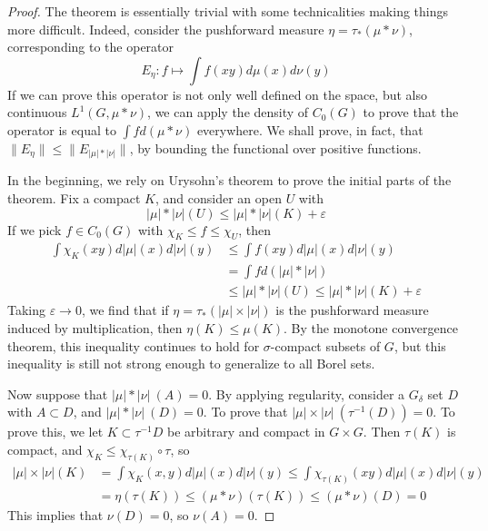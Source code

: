 \documentclass{article}
\theoremstyle{plain}
\theoremstyle{definition}
\begin{document}
\begin{proof}
    The theorem is essentially trivial with some technicalities making things more difficult. Indeed, consider the pushforward measure $\eta = \tau_*(\mu * \nu)$, corresponding to the operator
    \[ E_\eta: f \mapsto \int f(xy) d\mu(x) d\nu(y) \]
    If we can prove this operator is not only well defined on the space, but also continuous $L^1(G, \mu * \nu)$, we can apply the density of $C_0(G)$ to prove that the operator is equal to $\int f d(\mu * \nu)$ everywhere. We shall prove, in fact, that $\| E_\eta \| \leq \| E_{|\mu| * |\nu|} \|$, by bounding the functional over positive functions.

    In the beginning, we rely on Urysohn's theorem to prove the initial parts of the theorem. Fix a compact $K$, and consider an open $U$ with
    \[ |\mu| * |\nu| (U) \leq |\mu| * |\nu| (K) + \varepsilon \]
    If we pick $f \in C_0(G)$ with $\chi_K \leq f \leq \chi_U$, then
    \begin{align*}
        \int \chi_K(xy) d |\mu|(x) d|\nu|(y) &\leq \int f(xy) d|\mu|(x) d|\nu|(y)\\
        &= \int f d(|\mu| * |\nu|)\\
        &\leq |\mu| * |\nu| (U) \leq |\mu| * |\nu| (K) + \varepsilon
    \end{align*}
    Taking $\varepsilon \to 0$, we find that if $\eta = \tau_*(|\mu| \times |\nu|)$ is the pushforward measure induced by multiplication, then $\eta(K) \leq \mu(K)$. By the monotone convergence theorem, this inequality continues to hold for $\sigma$-compact subsets of $G$, but this inequality is still not strong enough to generalize to all Borel sets.

    Now suppose that $|\mu| * |\nu|\ (A) = 0$. By applying regularity, consider a $G_\delta$ set $D$ with $A \subset D$, and $|\mu| * |\nu|\ (D) = 0$. To prove that $|\mu| \times |\nu|\ (\tau^{-1}(D)) = 0$. To prove this, we let $K \subset \tau^{-1} D$ be arbitrary and compact in $G \times G$. Then $\tau(K)$ is compact, and $\chi_K \leq \chi_{\tau(K)} \circ \tau$, so
    \begin{align*}
        |\mu| \times |\nu| (K) &= \int \chi_K(x,y) d|\mu|(x) d|\nu|(y) \leq \int \chi_{\tau(K)}(xy) d|\mu|(x) d|\nu|(y)\\
        &= \eta(\tau(K)) \leq (\mu * \nu)(\tau(K)) \leq (\mu * \nu)(D) = 0
    \end{align*}
    This implies that $\nu(D) = 0$, so $\nu(A) = 0$.


\end{proof}
\end{document}
